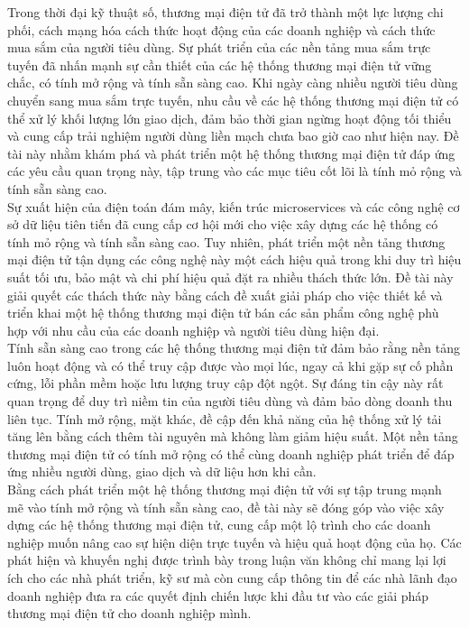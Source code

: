 \noindent Trong thời đại kỹ thuật số, thương mại điện tử đã trở thành một lực lượng chi phối, cách mạng hóa cách thức hoạt động của các doanh nghiệp và cách thức mua sắm của người tiêu dùng. 
Sự phát triển của các nền tảng mua sắm trực tuyến đã nhấn mạnh sự cần thiết của các hệ thống thương mại điện tử vững chắc, có tính mở rộng và tính sẵn sàng cao. 
Khi ngày càng nhiều người tiêu dùng chuyển sang mua sắm trực tuyến, nhu cầu về các hệ thống thương mại điện tử có thể xử lý khối lượng lớn giao dịch, đảm bảo thời gian ngừng hoạt động tối thiểu và cung cấp trải nghiệm người dùng liền mạch chưa bao giờ cao như hiện nay. Đề tài này nhằm khám phá và phát triển một hệ thống thương mại điện tử đáp ứng các yêu cầu quan trọng này, tập trung vào  các mục tiêu cốt lõi là tính mỏ rộng và tính sẵn sàng cao.\\[0.5cm]
Sự xuất hiện của điện toán đám mây, kiến trúc microservices và các công nghệ cơ sở dữ liệu tiên tiến đã cung cấp cơ hội mới cho việc xây dựng các hệ thống có tính mỏ rộng và tính sẵn sàng cao. 
Tuy nhiên, phát triển một nền tảng thương mại điện tử tận dụng các công nghệ này một cách hiệu quả trong khi duy trì hiệu suất tối ưu, bảo mật và chi phí hiệu quả đặt ra nhiều thách thức lớn. Đề tài này giải quyết các thách thức này bằng cách đề xuất giải pháp cho việc thiết kế và triển khai một hệ thống thương mại điện tử bán các sản phẩm công nghệ phù hợp với nhu cầu của các doanh nghiệp và người tiêu dùng hiện đại.\\[0.5cm]
Tính sẵn sàng cao trong các hệ thống thương mại điện tử đảm bảo rằng nền tảng luôn hoạt động và có thể truy cập được vào mọi lúc, ngay cả khi gặp sự cố phần cứng, lỗi phần mềm hoặc lưu lượng truy cập đột ngột. Sự đáng tin cậy này rất quan trọng để duy trì niềm tin của người tiêu dùng và đảm bảo dòng doanh thu liên tục. 
Tính mở rộng, mặt khác, đề cập đến khả năng của hệ thống xử lý tải tăng lên bằng cách thêm tài nguyên mà không làm giảm hiệu suất. Một nền tảng thương mại điện tử có tính mở rộng có thể cùng doanh nghiệp phát triển để đáp ứng nhiều người dùng, giao dịch và dữ liệu hơn khi cần.\\[0.5cm]
Bằng cách phát triển một hệ thống thương mại điện tử với sự tập trung mạnh mẽ vào tính mở rộng và tính sẵn sàng cao, đề tài này sẽ đóng góp vào việc xây dựng các hệ thống thương mại điện tử, cung cấp một lộ trình cho các doanh nghiệp muốn nâng cao sự hiện diện trực tuyến và hiệu quả hoạt động của họ. 
Các phát hiện và khuyến nghị được trình bày trong luận văn không chỉ mang lại lợi ích cho các nhà phát triển, kỹ sư mà còn cung cấp thông tin để các nhà lãnh đạo doanh nghiệp đưa ra các quyết định chiến lược khi đầu tư vào các giải pháp thương mại điện tử cho doanh nghiệp mình.


